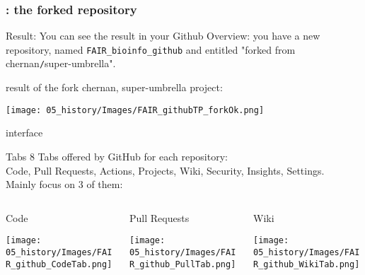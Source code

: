 \begin{frame}[containsverbatim]
\frametitle{: the forked repository}
\begin{exampleblock}{Result:}
You can see the result in your Github Overview: you have a new repository, named \verb|FAIR_bioinfo_github| and entitled "forked from chernan\verb|/|super-umbrella".
\end{exampleblock}
\begin{exampleblock}{result of the fork chernan, super-umbrella project:}
    \begin{center}
    \texttt{[image: 05\_history/Images/FAIR\_githubTP\_forkOk.png]}
    \end{center}
\end{exampleblock}
\end{frame}
\begin{frame}{ interface}
\begin{exampleblock}{Tabs}
8 Tabs offered by GitHub for each repository: \\
Code, Pull Requests, Actions, Projects, Wiki, Security, Insights, Settings.\\
Mainly focus on 3 of them:
\end{exampleblock}
\begin{columns}
\begin{column}{0.38\textwidth}
\begin{exampleblock}{Code}
\begin{center}
    \texttt{[image: 05\_history/Images/FAIR\_github\_CodeTab.png]}
\end{center}
\end{exampleblock}
\end{column}
\begin{column}{0.38\textwidth}
\begin{exampleblock}{Pull Requests}
\begin{center}
    \texttt{[image: 05\_history/Images/FAIR\_github\_PullTab.png]}
\end{center}
\end{exampleblock}
\end{column}
\begin{column}{0.2\textwidth}
\begin{exampleblock}{Wiki}
\begin{center}
    \texttt{[image: 05\_history/Images/FAIR\_github\_WikiTab.png]}
\end{center}
\end{exampleblock}
\end{column}
\end{columns}
\end{frame}
